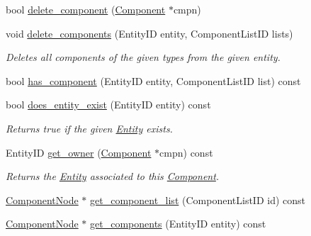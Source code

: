 \begin{DoxyCompactItemize}
bool \hyperlink{classnta_1_1ECS_ab24523ec53373bc159f67ee20d269975}{delete\+\_\+component} (\hyperlink{classnta_1_1Component}{Component} $\ast$cmpn)
\item 
\mbox{\label{classnta_1_1ECS_a283349003457513311fe9fe205e031bc}} 
void \hyperlink{classnta_1_1ECS_a283349003457513311fe9fe205e031bc}{delete\+\_\+components} (Entity\+ID entity, Component\+List\+ID lists)
\begin{DoxyCompactList}\small\item\em Deletes all components of the given types from the given entity. \end{DoxyCompactList}\item 
bool \hyperlink{classnta_1_1ECS_a370204d3b816a67fe22147f00d0c9447}{has\+\_\+component} (Entity\+ID entity, Component\+List\+ID list) const
\item 
\mbox{\label{classnta_1_1ECS_ac79684f4ead68218b93aa6f93877b54e}} 
bool \hyperlink{classnta_1_1ECS_ac79684f4ead68218b93aa6f93877b54e}{does\+\_\+entity\+\_\+exist} (Entity\+ID entity) const
\begin{DoxyCompactList}\small\item\em Returns true if the given \hyperlink{classnta_1_1Entity}{Entity} exists. \end{DoxyCompactList}\item 
\mbox{\label{classnta_1_1ECS_a132c523df15f7657cf4aa35973031a31}} 
Entity\+ID \hyperlink{classnta_1_1ECS_a132c523df15f7657cf4aa35973031a31}{get\+\_\+owner} (\hyperlink{classnta_1_1Component}{Component} $\ast$cmpn) const
\begin{DoxyCompactList}\small\item\em Returns the \hyperlink{classnta_1_1Entity}{Entity} associated to this \hyperlink{classnta_1_1Component}{Component}. \end{DoxyCompactList}\item 
\hyperlink{structnta_1_1utils_1_1LinkedNode}{Component\+Node} $\ast$ \hyperlink{classnta_1_1ECS_abd195033b6216d2dc8bf274a0ca82e4e}{get\+\_\+component\+\_\+list} (Component\+List\+ID id) const
\item 
\mbox{\label{classnta_1_1ECS_a5b2cc98462e1e510700ed7aab523cab1}} 
\hyperlink{structnta_1_1utils_1_1LinkedNode}{Component\+Node} $\ast$ \hyperlink{classnta_1_1ECS_a5b2cc98462e1e510700ed7aab523cab1}{get\+\_\+components} (Entity\+ID entity) const

\end{DoxyCompactItemize}
